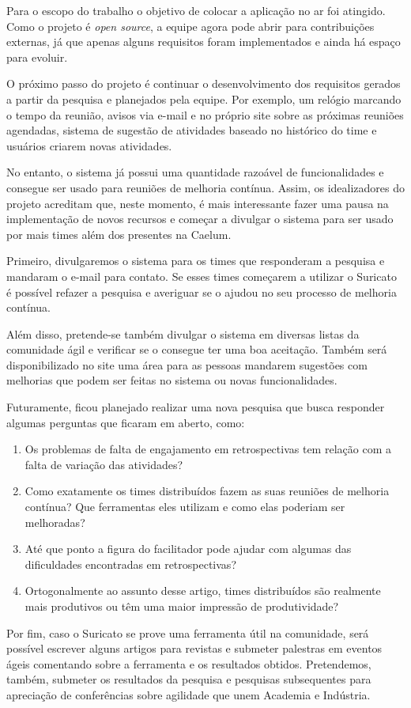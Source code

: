 Para o escopo do trabalho o objetivo de colocar a aplicação no ar foi atingido. Como o projeto é \textit{open source}, a equipe agora pode abrir para contribuições externas, já que apenas alguns requisitos foram implementados e ainda há espaço para evoluir.  

O próximo passo do projeto é continuar o desenvolvimento dos requisitos gerados a partir da pesquisa e planejados pela equipe. Por exemplo, um relógio marcando o tempo da reunião, avisos via e-mail e no próprio site sobre as próximas reuniões agendadas, sistema de sugestão de atividades baseado no histórico do time e  usuários criarem novas atividades.

No entanto, o sistema já possui uma quantidade razoável de funcionalidades e consegue ser usado para reuniões de melhoria contínua. Assim, os idealizadores do projeto acreditam que, neste momento, é mais interessante fazer uma pausa na implementação de novos recursos e começar a divulgar o sistema para ser usado por mais times além dos presentes na Caelum.

Primeiro, divulgaremos o sistema para os times que responderam a pesquisa e mandaram o e-mail para contato. Se esses times começarem a utilizar o Suricato é possível refazer a pesquisa e averiguar se o \suricato{} ajudou no seu processo de melhoria contínua.

Além disso, pretende-se também divulgar o sistema em diversas listas da comunidade ágil e verificar se o \suricato{} consegue ter uma boa aceitação. Também será disponibilizado no site uma área para as pessoas mandarem sugestões com melhorias que podem ser feitas no sistema ou novas funcionalidades.

Futuramente, ficou planejado realizar uma nova pesquisa que busca responder algumas perguntas que ficaram em aberto, como:

\begin{enumerate}
	\item Os problemas de falta de engajamento em retrospectivas tem relação com a falta de variação das atividades?
	\item Como exatamente os times distribuídos fazem as suas reuniões de melhoria contínua? Que ferramentas eles utilizam e como elas poderiam ser melhoradas?
	\item Até que ponto a figura do facilitador pode ajudar com algumas das dificuldades encontradas em retrospectivas?
	\item Ortogonalmente ao assunto desse artigo, times distribuídos são realmente mais produtivos ou têm uma maior impressão de produtividade?
\end{enumerate}

Por fim, caso o Suricato se prove uma ferramenta útil na comunidade, será possível escrever alguns artigos para revistas e submeter palestras em eventos ágeis comentando sobre a ferramenta e os resultados obtidos. Pretendemos, também, submeter os resultados da pesquisa e pesquisas subsequentes para apreciação de conferências sobre agilidade que unem Academia e Indústria.